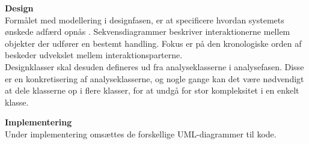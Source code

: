 \textbf{Design}\\
Formålet med modellering i designfasen, er at specificere hvordan systemets ønskede adfærd opnås \citep{Arlow2002}. Sekvensdiagrammer beskriver interaktionerne mellem objekter der udfører en bestemt handling. Fokus er på den kronologiske orden af beskeder udvekslet mellem interaktionsparterne. \citep{Seidl2012}\\
Designklasser skal desuden defineres ud fra analyseklasserne i analysefasen. Disse er en konkretisering af analyseklasserne, og nogle gange kan det være nødvendigt at dele klasserne op i flere klasser, for at undgå for stor kompleksitet i en enkelt klasse. \citep{Arlow2002}

\textbf{Implementering}\\
Under implementering omsættes de forskellige UML-diagrammer til kode. \citep{Arlow2002}







